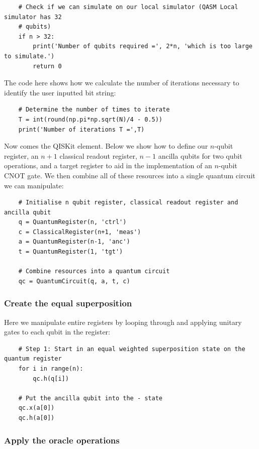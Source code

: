 \begin{verbatim}	
	# Check if we can simulate on our local simulator (QASM Local simulator has 32 
	# qubits)
	if n > 32:
		print('Number of qubits required =', 2*n, 'which is too large to simulate.')
		return 0
\end{verbatim}

The code here shows how we calculate the number of iterations necessary to identify the user inputted bit string:

\begin{verbatim}	
	# Determine the number of times to iterate 
	T = int(round(np.pi*np.sqrt(N)/4 - 0.5)) 
	print('Number of iterations T =',T)
\end{verbatim}

Now comes the QISKit element. Below we show how to define our $n$-qubit register, an $n+1$ classical readout register, $n-1$ ancilla qubits for two qubit operations, and a target register to aid in the implementation of an $n$-qubit CNOT gate. We then combine all of these resources into a single quantum circuit we can manipulate:

\begin{verbatim}
	# Initialise n qubit register, classical readout register and ancilla qubit
	q = QuantumRegister(n, 'ctrl')
	c = ClassicalRegister(n+1, 'meas')
	a = QuantumRegister(n-1, 'anc')
	t = QuantumRegister(1, 'tgt')
	
	# Combine resources into a quantum circuit
	qc = QuantumCircuit(q, a, t, c)
\end{verbatim}

\subsubsection{Create the equal superposition}

Here we manipulate entire registers by looping through and applying unitary gates to each qubit in the register:

\begin{verbatim}
	# Step 1: Start in an equal weighted superposition state on the quantum register 
	for i in range(n):
		qc.h(q[i])
	
	# Put the ancilla qubit into the - state
	qc.x(a[0])
	qc.h(a[0])
\end{verbatim}

\subsubsection{Apply the oracle operations}

